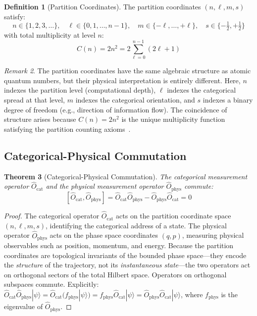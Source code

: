 \documentclass[twocolumn,10pt,a4paper]{article}
\newtheorem{theorem}{Theorem}[section]
\theoremstyle{definition}
\newtheorem{definition}[theorem]{Definition}
\theoremstyle{remark}
\newtheorem{remark}[theorem]{Remark}
\newcommand{\Ocat}{\hat{O}_{\mathrm{cat}}}
\newcommand{\Ophys}{\hat{O}_{\mathrm{phys}}}
\begin{document}
\begin{definition}[Partition Coordinates]
\label{def:partition}
The partition coordinates $(n, \ell, m, s)$ satisfy:
\begin{equation}
\label{eq:partition_coords}
n \in \{1, 2, 3, \ldots\}, \quad \ell \in \{0, 1, \ldots, n-1\}, \quad m \in \{-\ell, \ldots, +\ell\}, \quad s \in \{-\tfrac{1}{2}, +\tfrac{1}{2}\}
\end{equation}
with total multiplicity at level $n$:
\begin{equation}
\label{eq:multiplicity}
C(n) = 2n^2 = 2\sum_{\ell=0}^{n-1}(2\ell + 1)
\end{equation}
\end{definition}

\begin{remark}
The partition coordinates have the same algebraic structure as atomic quantum numbers, but their physical interpretation is entirely different. Here, $n$ indexes the partition level (computational depth), $\ell$ indexes the categorical spread at that level, $m$ indexes the categorical orientation, and $s$ indexes a binary degree of freedom (e.g., direction of information flow). The coincidence of structure arises because $C(n) = 2n^2$ is the unique multiplicity function satisfying the partition counting axioms~\citep{sachikonye2026partition, sachikonye2026counting}.
\end{remark}

\subsection{Categorical-Physical Commutation}

\begin{theorem}[Categorical-Physical Commutation]
\label{thm:commutation}
The categorical measurement operator $\Ocat$ and the physical measurement operator $\Ophys$ commute:
\begin{equation}
\label{eq:commutation}
[\Ocat, \Ophys] = \Ocat \Ophys - \Ophys \Ocat = 0
\end{equation}
\end{theorem}

\begin{proof}
The categorical operator $\Ocat$ acts on the partition coordinate space $(n, \ell, m, s)$, identifying the categorical address of a state. The physical operator $\Ophys$ acts on the phase space coordinates $(q, p)$, measuring physical observables such as position, momentum, and energy. Because the partition coordinates are topological invariants of the bounded phase space---they encode the \emph{structure} of the trajectory, not its \emph{instantaneous state}---the two operators act on orthogonal sectors of the total Hilbert space. Operators on orthogonal subspaces commute. Explicitly: $\Ocat \Ophys |\psi\rangle = \Ocat (f_{\mathrm{phys}} |\psi\rangle) = f_{\mathrm{phys}} \Ocat |\psi\rangle = \Ophys \Ocat |\psi\rangle$, where $f_{\mathrm{phys}}$ is the eigenvalue of $\Ophys$. \qedhere
\end{proof}
\end{document}
